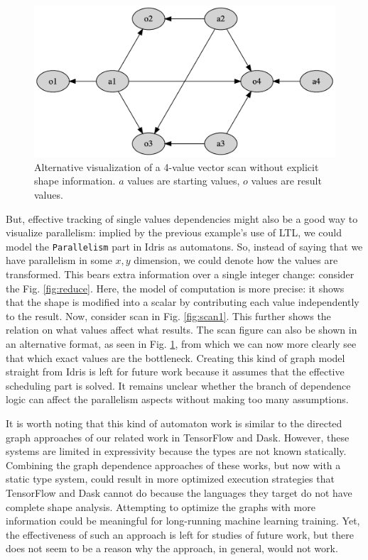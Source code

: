 \documentclass{report}
\begin{document}
\begin{figure}
  \centering
  \includegraphics[scale=0.25]{./assets/scan2.png}
  \caption{Alternative visualization of a 4-value vector scan without explicit shape information. $a$ values are starting values, $o$ values are result values.}
  \label{fig:scan2}
\end{figure}

But, effective tracking of single values dependencies might also be a good way to visualize parallelism: implied by the previous example's use of \gls{LTL}, we could model the \verb|Parallelism| part in Idris as automatons. So, instead of saying that we have parallelism in some $x,y$ dimension, we could denote how the values are transformed. This bears extra information over a single integer change: consider the Fig. \ref{fig:reduce}. Here, the model of computation is more precise: it shows that the shape is modified into a scalar by contributing each value independently to the result. Now, consider scan in Fig. \ref{fig:scan1}. This further shows the relation on what values affect what results. The scan figure can also be shown in an alternative format, as seen in Fig. \ref{fig:scan2}, from which we can now more clearly see that which exact values are the bottleneck. Creating this kind of graph model straight from Idris is left for future work because it assumes that the effective scheduling part is solved. It remains unclear whether the branch of dependence logic can affect the parallelism aspects without making too many assumptions.

It is worth noting that this kind of automaton work is similar to the directed graph approaches of our related work in TensorFlow and Dask. However, these systems are limited in expressivity because the types are not known statically. Combining the graph dependence approaches of these works, but now with a static type system, could result in more optimized execution strategies that TensorFlow and Dask cannot do because the languages they target do not have complete shape analysis. Attempting to optimize the graphs with more information could be meaningful for long-running machine learning training. Yet, the effectiveness of such an approach is left for studies of future work, but there does not seem to be a reason why the approach, in general, would not work.
\end{document}
